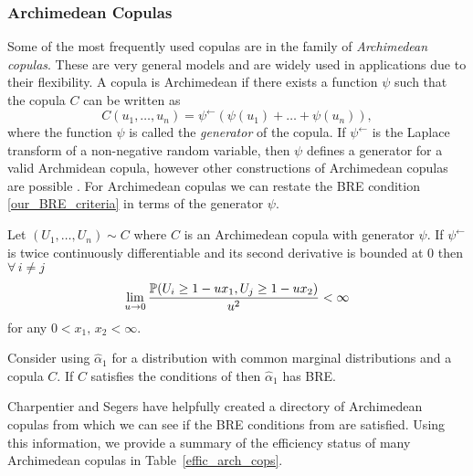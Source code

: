 \subsubsection{Archimedean Copulas}

Some of the most frequently used copulas are in the family of \emph{Archimedean copulas}. These are very general models and  are widely used in applications due to their flexibility. A copula is Archimedean if there exists a function $\psi$ such that the copula $C$ can be written as
\begin{equation*}
	C(u_1,\dots,u_n)=\psi^{\leftarrow}(\psi(u_1)+\dots+\psi(u_n)),
\end{equation*}
where the function $\psi$ is called the \emph{generator} of the copula. If $\psi^{\leftarrow}$ is the Laplace transform of a non-negative random variable, then $\psi$ defines a generator for a valid Archmidean copula, however other constructions of Archimedean copulas are possible \cite[p.\ 74]{nelsen2006introduction}.
For Archimedean copulas we can restate the BRE condition \eqref{our_BRE_criteria} in terms of the generator $\psi$.

\begin{theorem} \label{arch_cop_effic}
Let $(U_1, \dots, U_n) \sim C$ where $C$ is an Archimedean copula with generator $\psi$. If $\psi^{\leftarrow}$ is twice continuously differentiable and its second derivative is bounded at 0 then $\forall \, i \not= j$
\[ \lim_{u \to 0} \frac{\operatorname{{\mathbb P}}(U_i \geq 1 - u x_1, U_j \geq 1 - u x_2)}{u^2} < \infty  \]
for any $0 < x_1,\, x_2 < \infty$.
\end{theorem}

\begin{corollary} \label{cor:arch_effic}
Consider using $\hat{\alpha}_1$ for a distribution with common marginal distributions and a copula $C$. If $C$ satisfies the conditions of  then $\hat{\alpha}_1$ has BRE.
\end{corollary}

Charpentier and Segers \cite{charpentier2009tails} have helpfully created a directory of Archimedean copulas from which we can see if the BRE conditions from  are satisfied. Using this information, we provide a summary of the efficiency status of many Archimedean copulas in Table~\ref{effic_arch_cops}.

